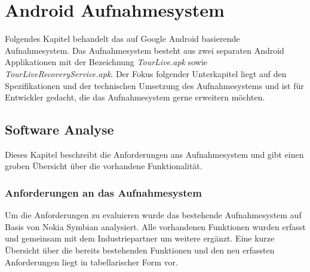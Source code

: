 \chapter{Android Aufnahmesystem}
\label{sec:androidaufnahmesystem}

Folgendes Kapitel behandelt das auf Google Android basierende Aufnahmesystem. Das Aufnahmesystem besteht aus zwei separaten Android Applikationen mit der Bezeichnung \textit{TourLive.apk} sowie \textit{TourLiveRecoveryService.apk}. Der Fokus folgender Unterkapitel liegt auf den Spezifikationen und der technischen Umsetzung des Aufnahmesystems und ist für Entwickler gedacht, die das Aufnahmesystem gerne erweitern möchten.

\section{Software Analyse}
Dieses Kapitel beschreibt die Anforderungen ans Aufnahmesystem und gibt einen groben Übersicht über die vorhandene Funktionalität.

\subsection{Anforderungen an das Aufnahmesystem}

Um die Anforderungen zu evaluieren wurde das bestehende Aufnahmesystem auf Basis von Nokia Symbian analysiert. Alle vorhandenen Funktionen wurden erfasst und gemeinsam mit dem Industriepartner um weitere ergänzt. 
Eine kurze Übersicht über die bereits bestehenden Funktionen und den neu erfassten Anforderungen liegt in tabellarischer Form vor.

